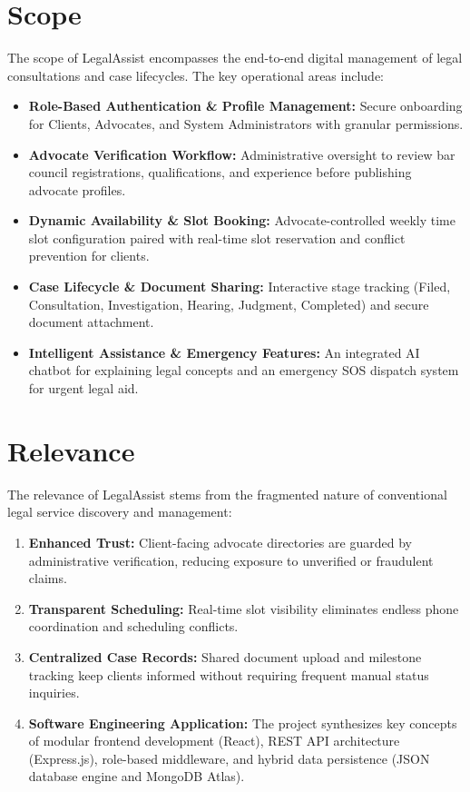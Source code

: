 \section{Scope}
The scope of LegalAssist encompasses the end-to-end digital management of legal consultations and case lifecycles. The key operational areas include:
\begin{itemize}
    \item \textbf{Role-Based Authentication \& Profile Management:} Secure onboarding for Clients, Advocates, and System Administrators with granular permissions.
    \item \textbf{Advocate Verification Workflow:} Administrative oversight to review bar council registrations, qualifications, and experience before publishing advocate profiles.
    \item \textbf{Dynamic Availability \& Slot Booking:} Advocate-controlled weekly time slot configuration paired with real-time slot reservation and conflict prevention for clients.
    \item \textbf{Case Lifecycle \& Document Sharing:} Interactive stage tracking (Filed, Consultation, Investigation, Hearing, Judgment, Completed) and secure document attachment.
    \item \textbf{Intelligent Assistance \& Emergency Features:} An integrated AI chatbot for explaining legal concepts and an emergency SOS dispatch system for urgent legal aid.
\end{itemize}

\section{Relevance}
The relevance of LegalAssist stems from the fragmented nature of conventional legal service discovery and management:
\begin{enumerate}
    \item \textbf{Enhanced Trust:} Client-facing advocate directories are guarded by administrative verification, reducing exposure to unverified or fraudulent claims.
    \item \textbf{Transparent Scheduling:} Real-time slot visibility eliminates endless phone coordination and scheduling conflicts.
    \item \textbf{Centralized Case Records:} Shared document upload and milestone tracking keep clients informed without requiring frequent manual status inquiries.
    \item \textbf{Software Engineering Application:} The project synthesizes key concepts of modular frontend development (React), REST API architecture (Express.js), role-based middleware, and hybrid data persistence (JSON database engine and MongoDB Atlas).
\end{enumerate}

